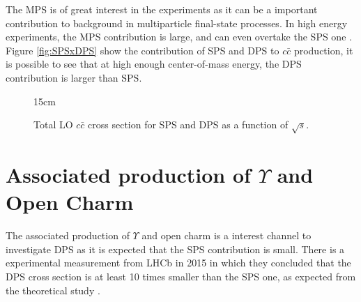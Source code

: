 The MPS is of great interest in the experiments as it can be a important contribution to background in multiparticle final-state processes. In high energy experiments, the MPS contribution is large, and can even overtake the SPS one \cite{Luszczak:2011zp}. Figure \ref{fig:SPSxDPS} show the contribution of SPS and DPS to $c \bar c$ production, it is possible to see that at high enough center-of-mass energy, the DPS contribution is larger than SPS.

\begin{figure}[!htm]{15cm} %
\caption{Total LO $c \bar{c}$ cross section for SPS and DPS as a function of $\sqrt{s}$.}%
\label{fig:SPSvsDPS}
\end{figure}

\section{Associated production of \texorpdfstring{$\Upsilon$}{Y } and Open Charm} \label{sec:theoryY+D}

The associated production of $\Upsilon$ and open charm is a interest channel to investigate DPS \cite{Lansberg:2019adr} as it is expected that the SPS contribution is small. There is a experimental measurement from LHCb in 2015 \cite{aaij2016production} in which they concluded that the DPS cross section is at least 10 times smaller than the SPS one, as expected from the theoretical study \cite{Berezhnoy:2015jga}. 


